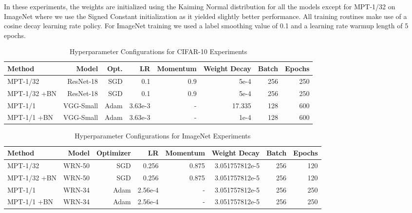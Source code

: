 \documentclass{article} \usepackage{iclr2021_conference,times}
\begin{document}
In these experiments, the weights are initialized using the Kaiming Normal distribution \citep{he2015delving} for all the models except for MPT-1/32 on ImageNet where we use the Signed Constant initialization \citep{ramanujan2019whats} as it yielded slightly better performance. All training routines make use of a cosine decay learning rate policy. For ImageNet training we used a label smoothing value of 0.1 and a learning rate warmup length of 5 epochs. 

\begin{table*}[h] 
\centering
\begin{small}
\begin{tabular}{@{}lrrrrrrr@{}}\toprule
\textbf{Method} & \textbf{Model} & \textbf{Opt.} & \textbf{LR} & \textbf{Momentum} & \textbf{Weight Decay} & \textbf{Batch} & \textbf{Epochs} \\ \midrule
MPT-1/32 & ResNet-18 & SGD & 0.1 & 0.9 & 5e-4 & 256 & 250 \\ \hdashline
MPT-1/32 +BN & ResNet-18 & SGD & 0.1 & 0.9 & 5e-4 & 256 & 250 \\ \hdashline
MPT-1/1 & VGG-Small & Adam & 3.63e-3 & - & 17.335 & 128 & 600 \\ \hdashline
MPT-1/1 +BN & VGG-Small & Adam & 3.63e-3 & - & 1e-4 & 128 & 600 \\ 
\bottomrule
\end{tabular}
\end{small}
\caption{Hyperparameter Configurations for CIFAR-10 Experiments}
\label{table:cifar-10-hyperparams-2}
\end{table*} 

\begin{table*}[h] 
\centering
\begin{small}
\begin{tabular}{@{}lrrrrrrr@{}}\toprule
\textbf{Method} & \textbf{Model} & \textbf{Optimizer} & \textbf{LR} & \textbf{Momentum} & \textbf{Weight Decay} & \textbf{Batch} & \textbf{Epochs} \\ \midrule
MPT-1/32 & WRN-50 & SGD & 0.256 & 0.875 & 3.051757812e-5 & 256 & 120 \\ \hdashline
MPT-1/32 +BN & WRN-50 & SGD & 0.256 & 0.875 & {3.051757812e-5} & 256 & 120 \\ \hdashline
MPT-1/1 & WRN-34 & Adam & 2.56e-4 & - & 3.051757812e-5 & 256 & 250 \\ \hdashline
MPT-1/1 +BN & WRN-34 & Adam & 2.56e-4 & - & 3.051757812e-5 & 256 & 250 \\ 
\bottomrule
\end{tabular}
\end{small}
\caption{Hyperparameter Configurations for ImageNet Experiments}
\label{table:imagenet-hyperparams}
\end{table*} 
\end{document}
